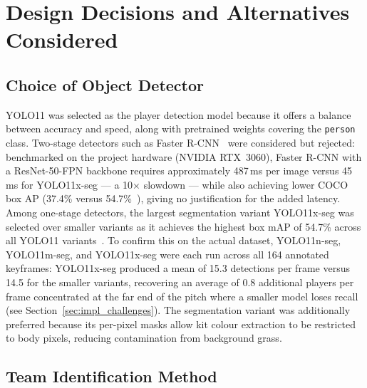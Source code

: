 \section{Design Decisions and Alternatives Considered}%
\label{sec:design_decisions}

\subsection{Choice of Object Detector}%
\label{sec:design_det_choice}

YOLO11 was selected as the player detection model because it offers a balance between accuracy and speed, along with pretrained weights covering the \texttt{person} class. Two-stage detectors such as Faster R-CNN~\cite{ren2015faster} were considered but rejected: benchmarked on the project hardware (NVIDIA RTX~3060), Faster R-CNN with a ResNet-50-FPN backbone requires approximately 487\,ms per image versus 45\,ms for YOLO11x-seg — a 10$\times$ slowdown — while also achieving lower COCO box AP (37.4\% versus 54.7\%~\cite{ultralytics2024yolo11}), giving no justification for the added latency. Among one-stage detectors, the largest segmentation variant YOLO11x-seg was selected over smaller variants as it achieves the highest box mAP of 54.7\% across all YOLO11 variants~\cite{ultralytics2024yolo11}. To confirm this on the actual dataset, YOLO11n-seg, YOLO11m-seg, and YOLO11x-seg were each run across all 164 annotated keyframes: YOLO11x-seg produced a mean of 15.3 detections per frame versus 14.5 for the smaller variants, recovering an average of 0.8 additional players per frame concentrated at the far end of the pitch where a smaller model loses recall (see Section~\ref{sec:impl_challenges}). The segmentation variant was additionally preferred because its per-pixel masks allow kit colour extraction to be restricted to body pixels, reducing contamination from background grass.

\subsection{Team Identification Method}%
\label{sec:design_teamid_choice}

